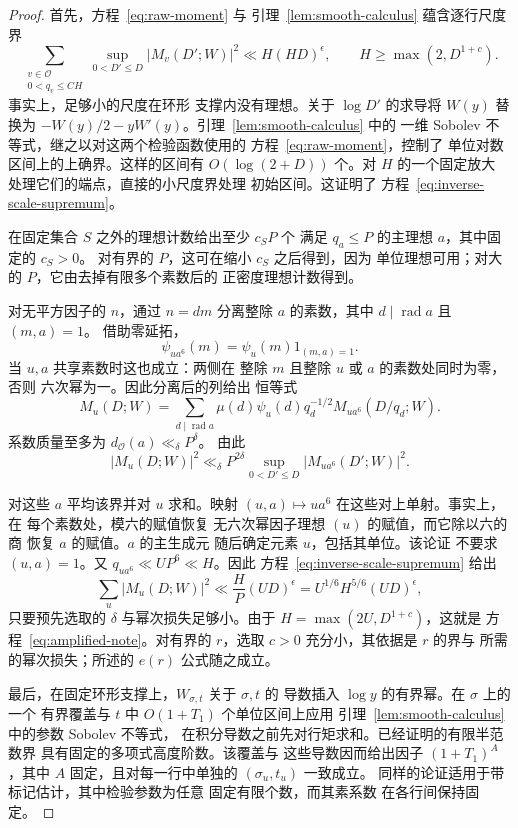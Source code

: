 \begin{proof}
首先，方程~\eqref{eq:raw-moment} 与
引理~\ref{lem:smooth-calculus} 蕴含逐行尺度界
\begin{equation}\label{eq:inverse-scale-supremum}
 \sum_{\substack{v\in\mathcal O\\0<q_v\le C H}}
       \sup_{0<D'\le D}|M_v(D';W)|^2
 \ll H(HD)^\epsilon,\qquad H\ge\max(2,D^{1+c}).
\end{equation}
事实上，足够小的尺度在环形
支撑内没有理想。关于 \(\log D'\) 的求导将
\(W(y)\) 替换为 \(-W(y)/2-yW'(y)\)。引理~\ref{lem:smooth-calculus} 中的
一维 Sobolev 不等式，继之以对这两个检验函数使用的
方程~\eqref{eq:raw-moment}，控制了
单位对数区间上的上确界。这样的区间有
\(O(\log(2+D))\) 个。对 \(H\) 的一个固定放大
处理它们的端点，直接的小尺度界处理
初始区间。这证明了
方程~\eqref{eq:inverse-scale-supremum}。

在固定集合 \(S\) 之外的理想计数给出至少 \(c_S P\) 个
满足 \(q_a\le P\) 的主理想 \(a\)，其中固定的 \(c_S>0\)。
对有界的 \(P\)，这可在缩小 \(c_S\) 之后得到，因为
单位理想可用；对大的 \(P\)，它由去掉有限多个素数后的
正密度理想计数得到。

对无平方因子的 \(n\)，通过
\(n=dm\) 分离整除 \(a\) 的素数，其中 \(d\mid\operatorname{rad}a\) 且 \((m,a)=1\)。
借助零延拓，
\[
 \psi_{ua^6}(m)=\psi_u(m)1_{(m,a)=1}.
\]
当 \(u,a\) 共享素数时这也成立：两侧在
整除 \(m\) 且整除 \(u\) 或 \(a\) 的素数处同时为零，否则
六次幂为一。因此分离后的列给出
恒等式
\begin{equation}\label{eq:sixth-power-column-identity}
 M_u(D;W)=\sum_{d\mid\operatorname{rad}a}
       \mu(d)\psi_u(d)q_d^{-1/2}M_{ua^6}(D/q_d;W).
\end{equation}
系数质量至多为 \(d_{\mathcal O}(a)\ll_\delta P^\delta\)。
由此
\[
 |M_u(D;W)|^2\ll_\delta
 P^{2\delta}\sup_{0<D'\le D}|M_{ua^6}(D';W)|^2.
\]

对这些 \(a\) 平均该界并对 \(u\) 求和。映射
\((u,a)\mapsto ua^6\) 在这些对上单射。事实上，在
每个素数处，模六的赋值恢复
无六次幂因子理想 \((u)\) 的赋值，而它除以六的商
恢复 \(a\) 的赋值。\(a\) 的主生成元
随后确定元素 \(u\)，包括其单位。该论证
不要求 \((u,a)=1\)。又
\(q_{ua^6}\ll UP^6\ll H\)。因此
方程~\eqref{eq:inverse-scale-supremum} 给出
\[
 \sum_u|M_u(D;W)|^2
 \ll \frac HP(UD)^\epsilon
 =U^{1/6}H^{5/6}(UD)^\epsilon,
\]
只要预先选取的 \(\delta\) 与幂次损失足够小。由于
\(H=\max(2U,D^{1+c})\)，这就是
方程~\eqref{eq:amplified-note}。对有界的 \(r\)，选取
\(c>0\) 充分小，其依据是 \(r\) 的界与
所需的幂次损失；所述的 \(e(r)\) 公式随之成立。

最后，在固定环形支撑上，\(W_{\sigma,t}\) 关于 \(\sigma,t\) 的
导数插入 \(\log y\) 的有界幂。在 \(\sigma\) 上的一个
有界覆盖与 \(t\) 中 \(O(1+T_1)\) 个单位区间上应用
引理~\ref{lem:smooth-calculus} 中的参数 Sobolev 不等式，
在积分导数之前先对行矩求和。已经证明的有限半范数界
具有固定的多项式高度阶数。该覆盖与
这些导数因而给出因子 \((1+T_1)^A\)，其中
\(A\) 固定，且对每一行中单独的 \((\sigma_u,t_u)\) 一致成立。
同样的论证适用于带标记估计，其中检验参数为任意
固定有限个数，而其素系数
在各行间保持固定。
\end{proof}

